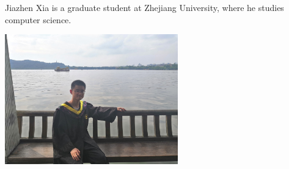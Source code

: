 \documentclass{book}
\theoremstyle{definition}
\newcounter{lcounter}
\begin{document}
\begin{center}
\begin{tcolorbox}[width=5in,colback={white},title={\begin{center}\texttt{About the Author} \addtocounter{lcounter}{1}  \end{center}},colbacktitle=Yellow,coltitle=black]
Jiazhen Xia is a graduate student at Zhejiang University, where he studies computer science. \\
\begin{center}
\includegraphics[width=7.5cm]{about2.jpg}
\end{center}
\end{tcolorbox}
\end{center}
\newpage
\ \\
\thispagestyle{empty}
\end{document}
